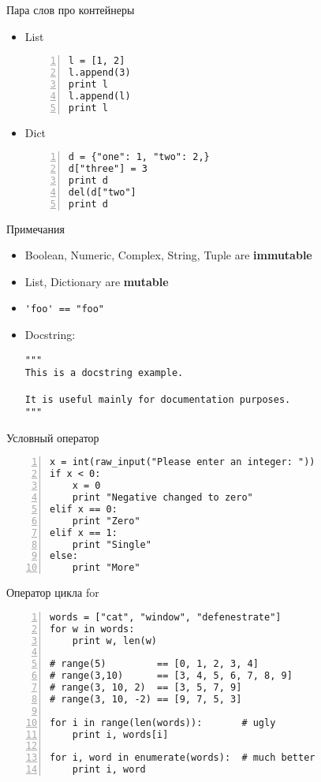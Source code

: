 \documentclass[hyperref={pdftex,unicode}]{beamer}
\begin{document}
\begin{frame}[fragile]{Пара слов про контейнеры}
  \begin{itemize}
    \item List
      \begin{lstlisting}[numbers=left]
l = [1, 2]
l.append(3)
print l
l.append(l)
print l
      \end{lstlisting}
    \item Dict
      \begin{lstlisting}[numbers=left]
d = {"one": 1, "two": 2,}
d["three"] = 3
print d
del(d["two"]
print d
      \end{lstlisting}
  \end{itemize}
\end{frame}

\begin{frame}[fragile]{Примечания}
  \begin{itemize}
    \item Boolean, Numeric, Complex, String, Tuple are \textbf{immutable}
    \item List, Dictionary are \textbf{mutable}
    \item \lstinline$'foo' == "foo"$
    \item Docstring:
      \begin{lstlisting}
"""
This is a docstring example.

It is useful mainly for documentation purposes.
"""
      \end{lstlisting}
  \end{itemize}
\end{frame}

\begin{frame}[fragile]{Условный оператор}
  \begin{lstlisting}[numbers=left]
x = int(raw_input("Please enter an integer: "))
if x < 0:
    x = 0
    print "Negative changed to zero"
elif x == 0:
    print "Zero"
elif x == 1:
    print "Single"
else:
    print "More"
  \end{lstlisting}
\end{frame}

\begin{frame}[fragile]{Оператор цикла for}
  \begin{lstlisting}[numbers=left]
words = ["cat", "window", "defenestrate"]
for w in words:
    print w, len(w)

# range(5)         == [0, 1, 2, 3, 4]
# range(3,10)      == [3, 4, 5, 6, 7, 8, 9]
# range(3, 10, 2)  == [3, 5, 7, 9]
# range(3, 10, -2) == [9, 7, 5, 3]

for i in range(len(words)):       # ugly
    print i, words[i]

for i, word in enumerate(words):  # much better
    print i, word

\end{lstlisting}
\end{frame}
\end{document}
